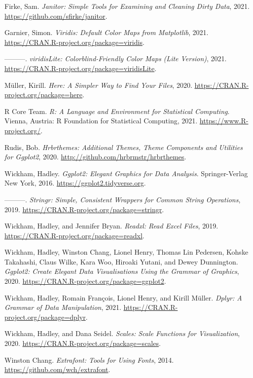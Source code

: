 \documentclass[
  12pt,
]{article}
\newlength{\cslhangindent}
\newenvironment{CSLReferences}[2] %
 {%
  \setlength{\parindent}{0pt}
  \ifodd #1 \everypar{\setlength{\hangindent}{\cslhangindent}}\ignorespaces\fi
  \ifnum #2 > 0
  \setlength{\parskip}{#2\baselineskip}
  \fi
 }%
 {}
\begin{document}
\hypertarget{refs}{}
\begin{CSLReferences}{1}{0}
\leavevmode{}%
Firke, Sam. \emph{Janitor: Simple Tools for Examining and Cleaning Dirty
Data}, 2021. \url{https://github.com/sfirke/janitor}.

\leavevmode{}%
Garnier, Simon. \emph{Viridis: Default Color Maps from Matplotlib},
2021. \url{https://CRAN.R-project.org/package=viridis}.

\leavevmode{}%
---------. \emph{viridisLite: Colorblind-Friendly Color Maps (Lite
Version)}, 2021. \url{https://CRAN.R-project.org/package=viridisLite}.

\leavevmode{}%
Müller, Kirill. \emph{Here: A Simpler Way to Find Your Files}, 2020.
\url{https://CRAN.R-project.org/package=here}.

\leavevmode{}%
R Core Team. \emph{R: A Language and Environment for Statistical
Computing}. Vienna, Austria: R Foundation for Statistical Computing,
2021. \url{https://www.R-project.org/}.

\leavevmode{}%
Rudis, Bob. \emph{Hrbrthemes: Additional Themes, Theme Components and
Utilities for Ggplot2}, 2020.
\url{http://github.com/hrbrmstr/hrbrthemes}.

\leavevmode{}%
Wickham, Hadley. \emph{Ggplot2: Elegant Graphics for Data Analysis}.
Springer-Verlag New York, 2016. \url{https://ggplot2.tidyverse.org}.

\leavevmode{}%
---------. \emph{Stringr: Simple, Consistent Wrappers for Common String
Operations}, 2019. \url{https://CRAN.R-project.org/package=stringr}.

\leavevmode{}%
Wickham, Hadley, and Jennifer Bryan. \emph{Readxl: Read Excel Files},
2019. \url{https://CRAN.R-project.org/package=readxl}.

\leavevmode{}%
Wickham, Hadley, Winston Chang, Lionel Henry, Thomas Lin Pedersen,
Kohske Takahashi, Claus Wilke, Kara Woo, Hiroaki Yutani, and Dewey
Dunnington. \emph{Ggplot2: Create Elegant Data Visualisations Using the
Grammar of Graphics}, 2020.
\url{https://CRAN.R-project.org/package=ggplot2}.

\leavevmode{}%
Wickham, Hadley, Romain François, Lionel Henry, and Kirill Müller.
\emph{Dplyr: A Grammar of Data Manipulation}, 2021.
\url{https://CRAN.R-project.org/package=dplyr}.

\leavevmode{}%
Wickham, Hadley, and Dana Seidel. \emph{Scales: Scale Functions for
Visualization}, 2020. \url{https://CRAN.R-project.org/package=scales}.

\leavevmode{}%
Winston Chang. \emph{Extrafont: Tools for Using Fonts}, 2014.
\url{https://github.com/wch/extrafont}.

\end{CSLReferences}
\end{document}
